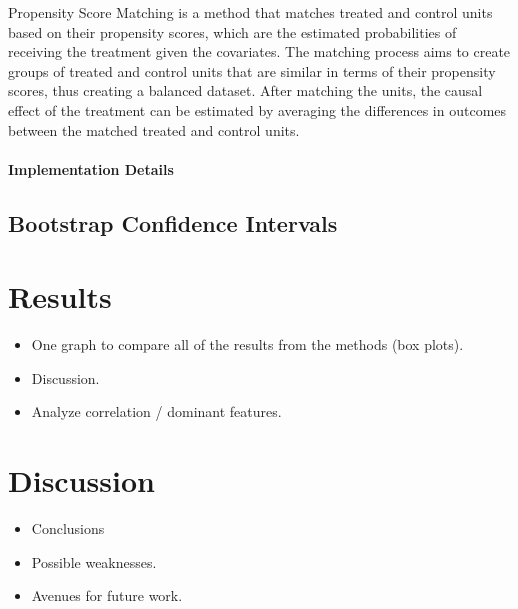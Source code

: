 \documentclass[11pt]{article}
\newcommand{\todo}[1]{{\color{orange}{TODO: #1}}}
\begin{document}
Propensity Score Matching is a method that matches treated and control units based on their propensity scores, which are the estimated probabilities of receiving the treatment given the covariates. The matching process aims to create groups of treated and control units that are similar in terms of their propensity scores, thus creating a balanced dataset. After matching the units, the causal effect of the treatment can be estimated by averaging the differences in outcomes between the matched treated and control units.

\paragraph{Implementation Details} \todo{Details about the implementation of Propensity Score Matching.}





\subsection{Bootstrap Confidence Intervals}








\section{Results}

\begin{itemize}
    \item One graph to compare all of the results from the methods (box plots).
    \item Discussion.
    \item Analyze correlation / dominant features.
\end{itemize}

\section{Discussion}

\begin{itemize}
    \item Conclusions
    \item Possible weaknesses.
    \item Avenues for future work.
\end{itemize}



\appendix
\end{document}
